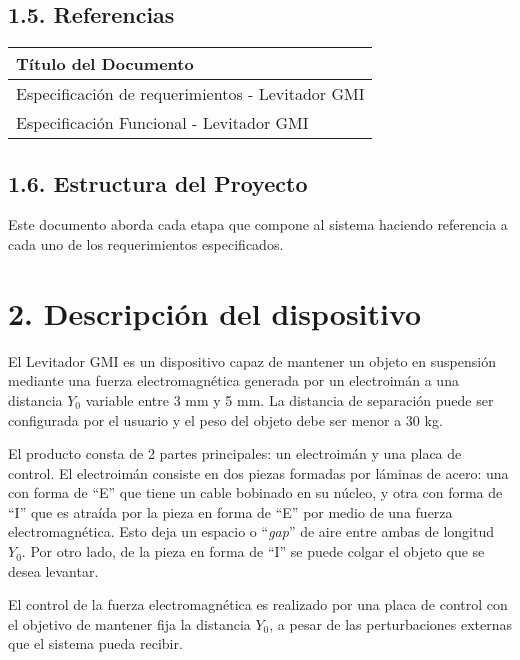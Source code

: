 \documentclass{article} %
\begin{document}
\subsection{1.5. Referencias}

\noindent 

\begin{tabular}{|p{4.3in}|} \hline 
T\'{i}tulo del Documento \\ \hline 
Especificaci\'{o}n de requerimientos - Levitador GMI \\ \hline 
Especificaci\'{o}n Funcional - Levitador GMI \\ \hline 
\end{tabular}

\textbf{}

\noindent 
\subsection{1.6. Estructura del Proyecto}

\noindent Este documento aborda cada etapa que compone al sistema haciendo referencia a cada uno de los requerimientos especificados.

\noindent 
\section{2. Descripci\'{o}n del dispositivo}

\noindent 

\noindent El Levitador GMI es un dispositivo capaz de mantener un objeto en suspensi\'{o}n  mediante una fuerza electromagn\'{e}tica generada por un electroim\'{a}n a una distancia $Y_0$ variable entre 3 mm y 5 mm. La distancia de separaci\'{o}n puede ser configurada por el usuario y el peso del objeto debe ser menor a 30 kg. 

\noindent 

\noindent El producto consta de 2 partes principales: un electroim\'{a}n y una placa de control. El electroim\'{a}n consiste en dos piezas formadas por l\'{a}minas de acero: una con forma de ``E'' que tiene un cable bobinado en su n\'{u}cleo, y otra con forma de ``I'' que es atra\'{i}da por la pieza en forma de ``E'' por medio de una fuerza electromagn\'{e}tica. Esto deja un espacio o ``\textit{gap}'' de aire entre ambas de longitud $Y_0$. Por otro lado, de la pieza en forma de ``I'' se puede colgar el objeto que se desea levantar.

\noindent 

\noindent El control de la fuerza electromagn\'{e}tica es realizado por una placa de control con el objetivo de mantener fija la distancia $Y_0$, a pesar de las perturbaciones externas que el sistema pueda recibir. 
\end{document}
